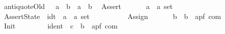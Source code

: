 \begin{isabellebody}
\ \ {\isachardoublequoteopen}{\isacharunderscore}antiquoteOld{\isachardoublequoteclose}\ \ {\isacharcolon}{\isacharcolon}\ {\isachardoublequoteopen}{\isacharparenleft}{\isacharprime}a\ {\isacharequal}{\isachargreater}\ {\isacharprime}b{\isacharparenright}\ {\isacharequal}{\isachargreater}\ {\isacharprime}a\ {\isacharequal}{\isachargreater}\ {\isacharprime}b{\isachardoublequoteclose}\isanewline
\ \ {\isachardoublequoteopen}{\isacharunderscore}Assert{\isachardoublequoteclose}\ \ \ \ \ \ {\isacharcolon}{\isacharcolon}\ {\isachardoublequoteopen}{\isacharprime}a\ {\isacharequal}{\isachargreater}\ {\isacharprime}a\ set{\isachardoublequoteclose}\ \ \ \ \ \ \ \ \ \ \ \ {\isacharparenleft}{\isachardoublequoteopen}{\isacharparenleft}{\isasymlbrace}{\isacharunderscore}{\isasymrbrace}{\isacharparenright}{\isachardoublequoteclose}\ {\isacharbrackleft}{}{\isacharbrackright}\ {}{}{}{}{\isacharparenright}\isanewline
\ \ {\isachardoublequoteopen}{\isacharunderscore}AssertState{\isachardoublequoteclose}\ {\isacharcolon}{\isacharcolon}\ {\isachardoublequoteopen}idt\ {\isasymRightarrow}\ {\isacharprime}a\ {\isacharequal}{\isachargreater}\ {\isacharprime}a\ set{\isachardoublequoteclose}\ \ \ \ \ {\isacharparenleft}{\isachardoublequoteopen}{\isacharparenleft}{\isasymlbrace}{\isacharunderscore}{\isachardot}\ {\isacharunderscore}{\isasymrbrace}{\isacharparenright}{\isachardoublequoteclose}\ {\isacharbrackleft}{}{}{}{}{\isacharcomma}{}{\isacharbrackright}\ {}{}{}{}{\isacharparenright}\isanewline
\ \ {\isachardoublequoteopen}{\isacharunderscore}Assign{\isachardoublequoteclose}\ \ \ \ \ \ {\isacharcolon}{\isacharcolon}\ {\isachardoublequoteopen}{\isacharprime}b\ {\isacharequal}{\isachargreater}\ {\isacharprime}b\ {\isacharequal}{\isachargreater}\ {\isacharparenleft}{\isacharprime}a{\isacharcomma}{\isacharprime}p{\isacharcomma}{\isacharprime}f{\isacharparenright}\ com{\isachardoublequoteclose}\ \ \ \ {\isacharparenleft}{\isachardoublequoteopen}{\isacharparenleft}{\isacharunderscore}\ {\isacharcolon}{\isacharequal}{\isacharequal}{\isacharslash}\ {\isacharunderscore}{\isacharparenright}{\isachardoublequoteclose}\ {\isacharbrackleft}{}{}{\isacharcomma}\ {}{}{\isacharbrackright}\ {}{}{\isacharparenright}\isanewline
\ \ {\isachardoublequoteopen}{\isacharunderscore}Init{\isachardoublequoteclose}\ \ \ \ \ \ \ \ {\isacharcolon}{\isacharcolon}\ {\isachardoublequoteopen}ident\ {\isasymRightarrow}\ {\isacharprime}c\ {\isasymRightarrow}\ {\isacharprime}b\ {\isasymRightarrow}\ {\isacharparenleft}{\isacharprime}a{\isacharcomma}{\isacharprime}p{\isacharcomma}{\isacharprime}f{\isacharparenright}\ com{\isachardoublequoteclose}\ \isanewline

\end{isabellebody}
